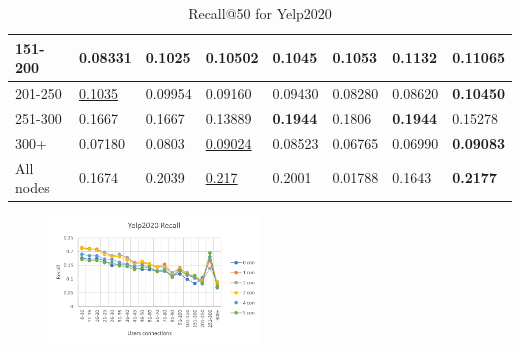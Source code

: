 \begin{table}[]
\begin{tabular}{|l|l|l|l|l|l|l||l|}
        151-200     & 0.08331                        & 0.1025                         & 0.10502                        & 0.1045                         & 0.1053                         & \textbf{0.1132}                 & 0.11065                    \\ \hline
        201-250     & \underline{0.1035}             & 0.09954                        & 0.09160                        & 0.09430                        & 0.08280                        & 0.08620                         & \textbf{0.10450}           \\ \hline
        251-300     & 0.1667                         & 0.1667                         & 0.13889                        & \textbf{0.1944}                & 0.1806                         & \textbf{0.1944}                 & 0.15278                    \\ \hline
        300+        & 0.07180                        & 0.0803                         & \underline{0.09024}            & 0.08523                        & 0.06765                        & 0.06990                         & \textbf{0.09083}           \\ \hline
        All nodes   & 0.1674                         & 0.2039                       & \underline{0.217}                          & 0.2001                         & 0.01788                        & 0.1643                          & \textbf{0.2177}            \\ \hline
    \end{tabular}
    \caption{Recall@50 for Yelp2020}
    \label{tab:yelp2020-recall-evaluation}
\end{table}

\begin{figure}[h!]
    \includegraphics[width=0.5\textwidth]{figures/evaluation/yelp-recall-evaluation.png}
    \centering
    \caption{}
    \label{}
\end{figure}


